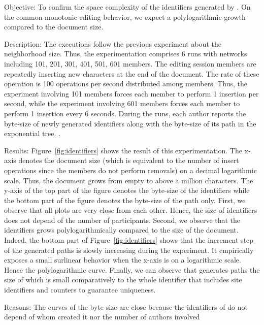 \begin{asparadesc}
\item [Objective:] To confirm the space complexity of the identifiers generated
  by \LSEQ. On the common monotonic editing behavior, we expect a
  polylogarithmic growth compared to the document size.
\item [Description:] The executions follow the previous experiment about the
  neighborhood size. Thus, the experimentation comprises 6 runs with networks
  including 101, 201, 301, 401, 501, 601 members. The editing session members
  are repeatedly inserting new characters at the end of the document. The rate
  of these operation is 100 operations per second distributed among
  members. Thus, the experiment involving 101 members forces each member to
  perform 1 insertion per second, while the experiment involving 601 members
  forces each member to perform 1 insertion every 6 seconds. During the runs,
  each author reports the byte-size of newly generated identifiers along with
  the byte-size of its path in the exponential tree. .
\item [Results:] Figure~\ref{fig:identifiers} shows the result of this
  experimentation. The x-axis denotes the document size (which is equivalent to
  the number of insert operations since the members do not perform removals) on
  a decimal logarithmic scale. Thus, the document grows from empty to above a
  million characters. The y-axis of the top part of the figure denotes the
  byte-size of the identifiers while the bottom part of the figure denotes the
  byte-size of the path only. First, we observe that all plots are very close
  from each other. Hence, the size of identifiers does not depend of the number
  of participants. Second, we observe that the identifiers grows
  polylogarithmically compared to the size of the document. Indeed, the bottom
  part of Figure~\ref{fig:identifiers} shows that the increment step of the
  generated paths is slowly increasing during the experiment. It empirically
  exposes a small surlinear behavior when the x-axis is on a logarithmic
  scale. Hence the polylogarithmic curve. Finally, we can observe that \LSEQ
  generates paths the size of which is small comparatively to the whole
  identifier that includes site identifiers and counters to guarantee
  uniqueness.
\item [Reasons:] The curves of the byte-size are close because the identifiers
  of \LSEQ do not depend of whom created it nor the number of authors involved

\end{asparadesc}
